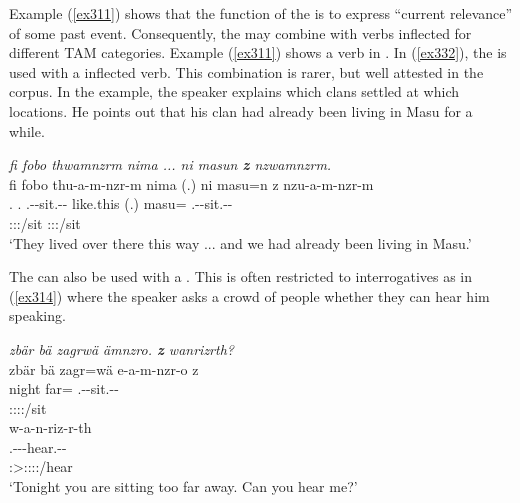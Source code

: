 Example (\ref{ex311}) shows that the function of the  is to express ``current relevance'' of some past event. Consequently, the  may combine with verbs inflected for different TAM categories. Example (\ref{ex311}) shows a verb in  . In (\ref{ex332}), the   is used with a   inflected verb. This combination is rarer, but well attested in the corpus. In the example, the speaker explains which clans settled at which locations. He points out that his clan had already been living in Masu for a while.

\begin{exe}
	\ex \emph{fi fobo thwamnzrm nima ... ni masun \textbf{z} nzwamnzrm.}\\
	\glll fi fobo thu-a-m-nzr-m nima (.) ni masu=n z nzu-a-m-nzr-m\\
	\Third.\Abs{} \Dist.\All{} \Stnsg.\Betaone-\Vc-sit.\Ext-\Ndu-\Dur{} like.this (.) \Fnsg{} masu=\Loc{} \Iam{} \Fnsg.\Betaone-\Vc-sit.\Ext-\Ndu-\Dur{}\\
	{} {} \footnotesize{\Stpl:\Sbj:\Pst:\Dur/sit} {} {} {} {} {} \footnotesize{\Fpl:\Sbj:\Pst:\Dur/sit}\\
	\trans `They lived over there this way ... and we had already been living in Masu.'
	\label{ex332}
\end{exe}

The   can also be used with a . This is often restricted to interrogatives as in (\ref{ex314}) where the speaker asks a crowd of people whether they can hear him speaking.

\begin{exe}
	\ex \emph{zbär bä zagrwä ämnzro. \textbf{z} wanrizrth?}\\
	\glll zbär bä zagr=wä e-a-m-nzr-o z\\
	night \Med{} far=\Emph{} \Stnsg.\Alph-\Vc-sit.\Ext-\Ndu-\Andat{} \Iam{}\\
	{} {} {} \footnotesize{\Stpl:\Sbj:\Nonpast:\Ipfv:\Andat/sit} {}\\
	\sn
	\glll w-a-n-riz-r-th\\
	\Fsg.\Alph-\Vc-\Venit-hear.\Ext-\Ndu-\Stnsg{}\\
	\footnotesize{\Stpl:\Sbj>\Fsg:\Io:\Nonpast:\Ipfv:\Venit/hear}\\
	\trans `Tonight you are sitting too far away. Can you hear me?'
	\label{ex314}
\end{exe}

